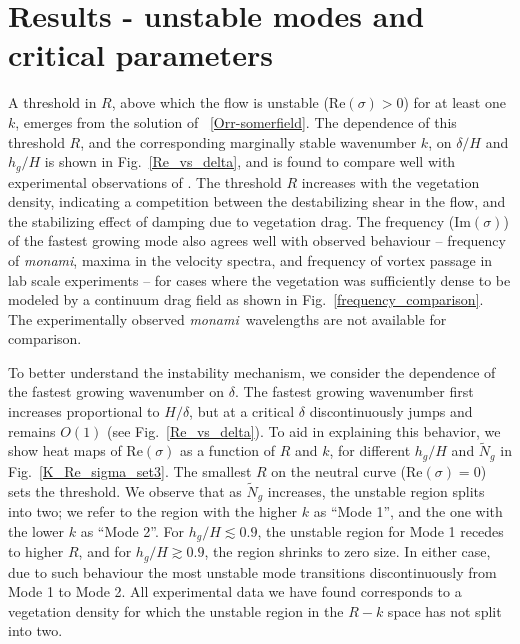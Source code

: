 \documentclass{jfm}
\newcommand{\hg}{h_g}
\renewcommand{\Rey}{{R}}
\newcommand{\Ndg}{\tilde{N}_g}
\newcommand{\monami}{\textit{monami}}
\begin{document}
\section{Results - unstable modes and critical parameters}
A threshold in $\Rey$, above which the flow is unstable (Re$(\sigma)>0$) for at least one $k$, emerges from the solution of ~\eqref{Orr-somerfield}. 
The dependence of this threshold $\Rey$, and the corresponding marginally stable wavenumber $k$, on $\delta/H$ and $\hg/H$ is shown in Fig.~\ref{Re_vs_delta}, and is found to compare well with experimental observations of \cite{Ghisal02}.
The threshold $\Rey$ increases with the vegetation density, indicating a competition between the destabilizing shear in the flow, and the stabilizing effect of damping due to vegetation drag.
The frequency (Im$(\sigma)$) of the fastest growing mode also agrees well with observed behaviour -- frequency of \monami, maxima in the velocity spectra, and frequency of vortex passage in lab scale experiments \citep{Ghisal02} -- for cases where the vegetation was sufficiently dense to be modeled by a continuum drag field as shown in Fig.~\ref{frequency_comparison}.  
The experimentally observed \monami ~wavelengths are not available for comparison.

To better understand the instability mechanism, we consider the dependence of the fastest growing wavenumber on $\delta$.
The fastest growing wavenumber first increases proportional to $H/\delta$, but at a critical $\delta$ discontinuously jumps and remains $O(1)$ (see Fig.~\ref{Re_vs_delta}). 
To aid in explaining this behavior, we show heat maps of Re$(\sigma)$ as a function of $\Rey$ and $k$, for different $\hg/H$ and $\Ndg$ in Fig.~\ref{K_Re_sigma_set3}. 
The smallest $\Rey$ on the neutral curve (Re$(\sigma)=0$) sets the threshold. 
We observe that as $\Ndg$ increases, the unstable region splits into two; we refer to the region with the higher $k$ as ``Mode 1'', and the one with the lower $k$ as ``Mode 2''. 
For $\hg/H\lesssim 0.9$, the unstable region for Mode 1 recedes to higher $\Rey$, and for $\hg/H \gtrsim 0.9$, the region shrinks to zero size.
In either case, due to such behaviour the most unstable mode transitions discontinuously from Mode 1 to Mode 2.
All experimental data we have found corresponds to a vegetation density for which the unstable region in the $\Rey-k$ space has not split into two. 
\end{document}
